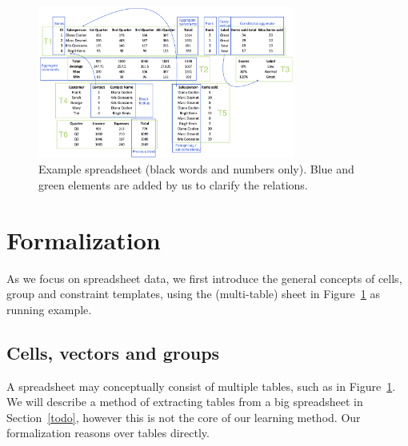 \documentclass{sig-alternate-05-2015}
\begin{document}

\begin{figure}[tbh]
  \begin{center}
    \includegraphics[width=0.75\textwidth]{figures/Demo.png}
  \end{center}
  \vspace{-10pt}
  \caption{Example spreadsheet (black words and numbers only). Blue and green elements are added by us to clarify the relations.}
  \label{fig:main_example}
\end{figure}

\section{Formalization}\label{sec:formalization}
As we focus on spreadsheet data, we first introduce the general concepts of cells, group and constraint templates, using the (multi-table) sheet in Figure~\ref{fig:main_example} as running example.

\subsection{Cells, vectors and groups}
A spreadsheet may conceptually consist of multiple tables, such as in Figure~\ref{fig:main_example}. We will describe a method of extracting tables from a big spreadsheet in Section~\ref{todo}, however this is not the core of our learning method. Our formalization reasons over tables directly.
\end{document}
